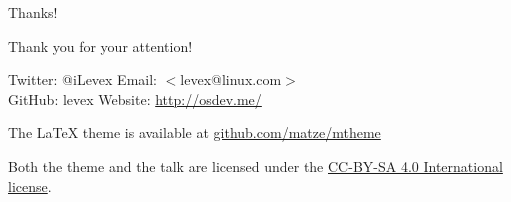 \documentclass{beamer} %
\makeatletter
\newcommand*{\emailify}[1]{$<$#1$>$}
\newcommand*{\myemail}{\emailify{levex@linux.com}}
\makeatother
\begin{document}
\begin{frame}{Thanks!}
\begin{center}
Thank you for your attention! \par
\end{center}

Twitter: @iLevex \hfill Email: \myemail \\
GitHub: levex \hfill Website: \url{http://osdev.me/}

\vspace{1cm}

\begin{small}
The \LaTeX\hskip1mm theme is available at \url{github.com/matze/mtheme}

Both the theme and the talk are licensed under the
\href{http://creativecommons.org/licenses/by-sa/4.0/}{CC-BY-SA 4.0 International license}.

\end{small}

\end{frame}
\end{document}
